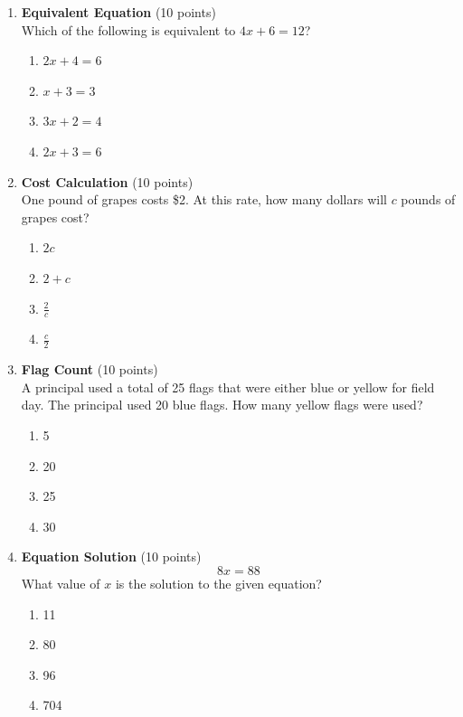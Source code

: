 \begin{enumerate}
  \item \textbf{Equivalent Equation} (10 points)\\
  Which of the following is equivalent to $4x+6=12$?\\
  \begin{enumerate}[label=(\Alph*)]
    \item $2x+4=6$
    \item $x+3=3$
    \item $3x+2=4$
    \item $2x+3=6$
  \end{enumerate}
  \begin{subanswer}
  \end{subanswer}

  \item \textbf{Cost Calculation} (10 points)\\
  One pound of grapes costs \$2. At this rate, how many dollars will $c$ pounds of grapes cost?\\
  \begin{enumerate}[label=(\Alph*)]
    \item $2c$
    \item $2+c$
    \item $\frac{2}{c}$
    \item $\frac{c}{2}$
  \end{enumerate}
  \begin{subanswer}
  \end{subanswer}

  \item \textbf{Flag Count} (10 points)\\
  A principal used a total of 25 flags that were either blue or yellow for field day. The principal used 20 blue flags. How many yellow flags were used?\\
  \begin{enumerate}[label=(\Alph*)]
    \item 5
    \item 20
    \item 25
    \item 30
  \end{enumerate}
  \begin{subanswer}
  \end{subanswer}

  \item \textbf{Equation Solution} (10 points)\\
  \[8x=88\]
  What value of $x$ is the solution to the given equation?\\
  \begin{enumerate}[label=(\Alph*)]
    \item 11
    \item 80
    \item 96
    \item 704
  \end{enumerate}
  \begin{subanswer}
  \end{subanswer}


\end{enumerate}
